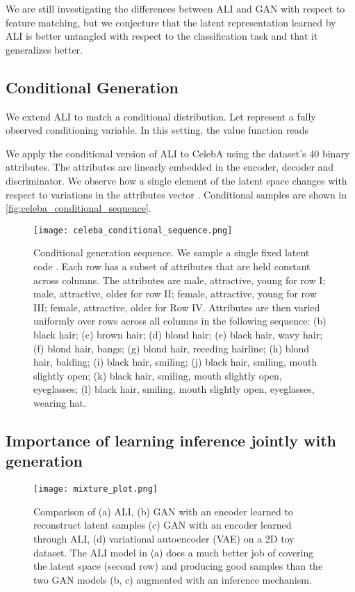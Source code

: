 \documentclass{article}
\begin{document}
We are still investigating the differences between ALI and GAN with respect to
feature matching, but we conjecture that the latent representation learned by
ALI is better untangled with respect to the classification task and that it
generalizes better.

\subsection{Conditional Generation}
We extend ALI to match a conditional distribution. Let  represent a
fully observed conditioning variable. In this setting, the value function reads

We apply the conditional version of ALI to CelebA using the dataset's 40 binary
attributes. The attributes are linearly embedded in the encoder, decoder and
discriminator. We observe how a single element of the latent space  changes
with respect to variations in the attributes vector . Conditional samples are
shown in \autoref{fig:celeba_conditional_sequence}.

\begin{figure}[htb!]
    \centering
    \texttt{[image: celeba\_conditional\_sequence.png]}
    \caption{\label{fig:celeba_conditional_sequence} Conditional generation
    sequence. We sample a single fixed latent code . Each row has a subset of
    attributes that are held constant across columns. The attributes are male,
    attractive, young for row I; male, attractive, older for row II; female,
    attractive, young for row III; female, attractive, older for Row IV.
    Attributes are then varied uniformly over rows across all columns in the
    following sequence: (b) black hair; (c) brown hair; (d) blond hair; (e)
    black hair, wavy hair; (f) blond hair, bangs; (g) blond hair, receding
    hairline; (h) blond hair, balding; (i) black hair, smiling; (j) black hair,
    smiling, mouth slightly open; (k) black hair, smiling, mouth slightly open,
    eyeglasses; (l) black hair, smiling, mouth slightly open, eyeglasses,
    wearing hat. }
\end{figure}

\subsection{Importance of learning inference jointly with generation}

\begin{figure}[htb!]
    \centering
    \texttt{[image: mixture\_plot.png]}
    \caption{\label{fig:mixture_plot} Comparison of (a) ALI, (b) GAN with an
    encoder learned to reconstruct latent samples (c) GAN with an encoder
    learned through ALI, (d) variational autoencoder (VAE) on a 2D toy dataset.
    The ALI model in (a) does a much better job of covering the latent space
    (second row) and producing good samples than the two GAN models (b, c)
    augmented with an inference mechanism.}
\end{figure}
\end{document}

